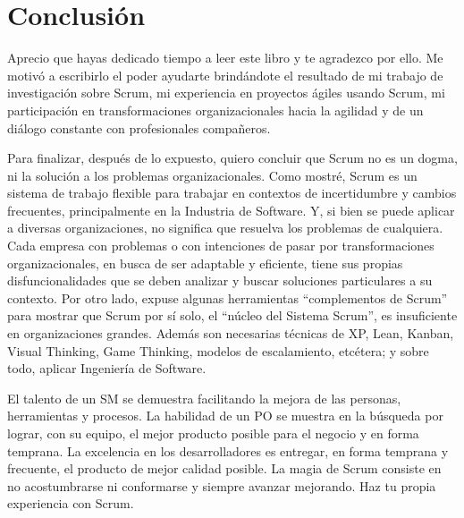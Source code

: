 \chapter{Conclusión}

Aprecio que hayas dedicado tiempo a leer este libro y te agradezco por ello. Me motivó a escribirlo el poder ayudarte brindándote el resultado de mi trabajo de investigación sobre Scrum, mi experiencia en proyectos ágiles usando Scrum, mi participación en transformaciones organizacionales hacia la agilidad y de un diálogo constante con profesionales compañeros. 

Para finalizar, después de lo expuesto, quiero concluir que Scrum no es un dogma, ni la solución a los problemas organizacionales. Como mostré, Scrum es un sistema de trabajo flexible para trabajar en contextos de incertidumbre y cambios frecuentes, principalmente en la Industria de Software. Y, si bien se puede aplicar a diversas organizaciones, no significa que resuelva los problemas de cualquiera. Cada empresa con problemas o con intenciones de pasar por transformaciones organizacionales, en busca de ser adaptable y eficiente, tiene sus propias disfuncionalidades que se deben analizar y buscar soluciones particulares a su contexto. Por otro lado, expuse algunas herramientas “complementos de Scrum” para mostrar que Scrum por sí solo, el “núcleo del Sistema Scrum”, es insuficiente en organizaciones grandes. Además son necesarias técnicas de XP, Lean, Kanban, Visual Thinking, Game Thinking, modelos de escalamiento, etcétera; y sobre todo, aplicar Ingeniería de Software.

El talento de un SM se demuestra facilitando la mejora de las personas, herramientas y procesos. La habilidad de un PO se muestra en la búsqueda por lograr, con su equipo, el mejor producto posible para el negocio y en forma temprana. La excelencia en los desarrolladores es entregar, en forma temprana y frecuente, el producto de mejor calidad posible. La magia de Scrum consiste en no acostumbrarse ni conformarse y siempre avanzar mejorando. Haz tu propia experiencia con Scrum.
